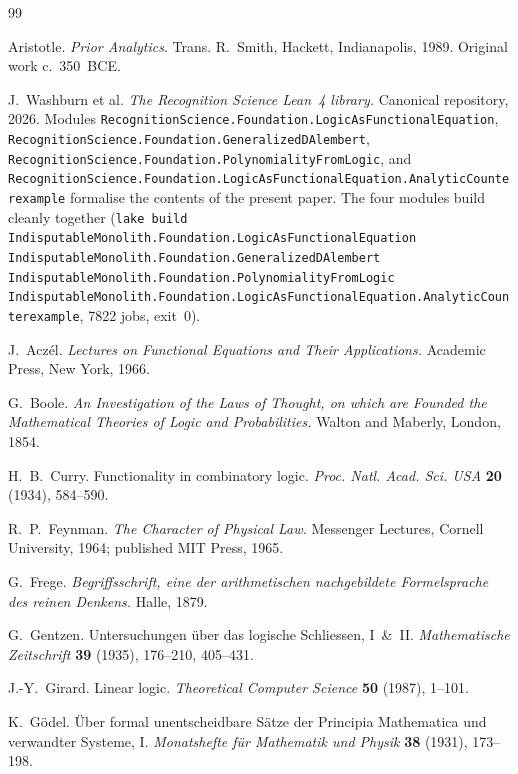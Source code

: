 \documentclass[11pt,a4paper]{article}
\theoremstyle{definition}
\theoremstyle{remark}
\begin{document}
\begin{thebibliography}{99}

Aristotle.
\textit{Prior Analytics}.
Trans. R.~Smith, Hackett, Indianapolis, 1989. Original work c.~350~BCE.

J.~Washburn et al.
\textit{The Recognition Science Lean~4 library.}
Canonical repository, 2026. Modules
\texttt{RecognitionScience.Foundation.LogicAsFunctionalEquation},
\texttt{RecognitionScience.Foundation.GeneralizedDAlembert},
\texttt{RecognitionScience.Foundation.PolynomialityFromLogic}, and
\texttt{RecognitionScience.Foundation.LogicAsFunctionalEquation.AnalyticCounterexample}
formalise the contents of the present paper.
The four modules build cleanly together
(\texttt{lake build IndisputableMonolith.Foundation.LogicAsFunctionalEquation
IndisputableMonolith.Foundation.GeneralizedDAlembert
IndisputableMonolith.Foundation.PolynomialityFromLogic
IndisputableMonolith.Foundation.LogicAsFunctionalEquation.AnalyticCounterexample},
7822 jobs, exit~0).

J.~Acz\'el.
\textit{Lectures on Functional Equations and Their Applications.}
Academic Press, New York, 1966.

G.~Boole.
\textit{An Investigation of the Laws of Thought, on which are Founded the
Mathematical Theories of Logic and Probabilities.}
Walton and Maberly, London, 1854.

H.~B.~Curry.
Functionality in combinatory logic.
\textit{Proc. Natl. Acad. Sci. USA} \textbf{20} (1934), 584--590.

R.~P.~Feynman.
\textit{The Character of Physical Law.}
Messenger Lectures, Cornell University, 1964; published MIT Press, 1965.

G.~Frege.
\textit{Begriffsschrift, eine der arithmetischen nachgebildete Formelsprache
des reinen Denkens.}
Halle, 1879.

G.~Gentzen.
Untersuchungen \"uber das logische Schliessen, I~\&~II.
\textit{Mathematische Zeitschrift} \textbf{39} (1935), 176--210, 405--431.

J.-Y.~Girard.
Linear logic.
\textit{Theoretical Computer Science} \textbf{50} (1987), 1--101.

K.~G\"odel.
\"Uber formal unentscheidbare S\"atze der Principia Mathematica und
verwandter Systeme, I.
\textit{Monatshefte f\"ur Mathematik und Physik} \textbf{38} (1931), 173--198.


\end{thebibliography}
\end{document}
